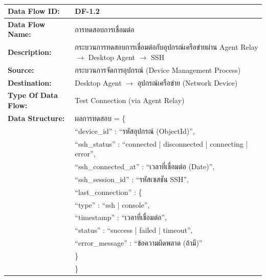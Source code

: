 \begin{table}[H]
    \caption{}
    \label{tab:df-1-2}
    \fontSixTeen 
    \begin{tabularx}{\textwidth}{|l|L|} 
        \hline
        \textbf{Data Flow ID:} & DF-1.2 \\
        \hline
        \textbf{Data Flow Name:} & การทดสอบการเชื่อมต่อ \\
        \hline
        \textbf{Description:} & กระบวนการทดสอบการเชื่อมต่อกับอุปกรณ์เครือข่ายผ่าน Agent Relay $\rightarrow$ Desktop Agent $\rightarrow$ SSH \\
        \hline
        \textbf{Source:} & กระบวนการจัดการอุปกรณ์ (Device Management Process) \\
        \hline
        \textbf{Destination:} & Desktop Agent $\rightarrow$ อุปกรณ์เครือข่าย (Network Device) \\
        \hline
        \textbf{Type Of Data Flow:} & Test Connection (via Agent Relay) \\
        \hline
        \textbf{Data Structure:} & ผลการทดสอบ = \{ \nonumber \\
                        & \hspace{1em} ``device\_id'' : ``รหัสอุปกรณ์ (ObjectId)'', \nonumber \\
                        & \hspace{1em} ``ssh\_status'' : ``connected | disconnected | connecting | error'', \nonumber \\
                        & \hspace{1em} ``ssh\_connected\_at'' : ``เวลาที่เชื่อมต่อ (Date)'', \nonumber \\
                        & \hspace{1em} ``ssh\_session\_id'' : ``รหัสเซสชัน SSH'', \nonumber \\
                        & \hspace{1em} ``last\_connection'' : \{ \nonumber \\
                        & \hspace{2em} ``type'' : ``ssh | console'', \nonumber \\
                        & \hspace{2em} ``timestamp'' : ``เวลาที่เชื่อมต่อ'', \nonumber \\
                        & \hspace{2em} ``status'' : ``success | failed | timeout'', \nonumber \\
                        & \hspace{2em} ``error\_message'' : ``ข้อความผิดพลาด (ถ้ามี)'' \nonumber \\
                        & \hspace{1em} \} \nonumber \\
                        & \} \\
        \hline
    \end{tabularx}
\end{table}

